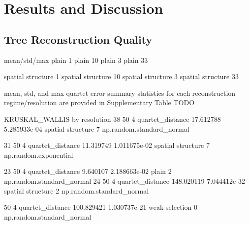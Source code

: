 \section{Results and Discussion} \label{sec:results}

\subsection{Tree Reconstruction Quality}



mean/std/max
plain	1%
plain	10%
plain	3%
plain	33%


spatial structure	1%
spatial structure	10%
spatial structure	3%
spatial structure	33%

mean, std, and max quartet error summary statistics for each reconstruction regime/resolution are provided in Supplementary Table TODO


KRUSKAL_WALLIS by resolution
38 	50 	4 	quartet_distance 	17.612788 	5.285933e-04 	spatial structure 	7 	np.random.standard_normal

31 	50 	4 	quartet_distance 	11.319749 	1.011675e-02 	spatial structure 	7 	np.random.exponential

23 	50 	4 	quartet_distance 	9.640107 	2.188663e-02 	plain 	2 	np.random.standard_normal
24 	50 	4 	quartet_distance 	148.020119 	7.044412e-32 	spatial structure 	2 	
np.random.standard_normal

50 	4 	quartet_distance 	100.829421 	1.030737e-21 	weak selection 	0 	np.random.standard_normal

